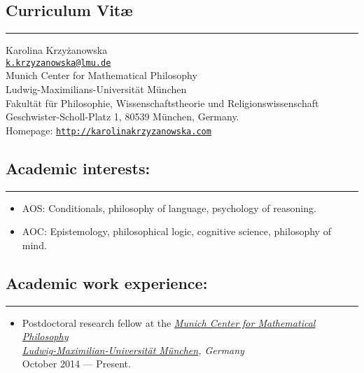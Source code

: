 \documentclass[a4paper,12pt]{article}
\begin{document}
\newcommand{\headone}[1] {
 \section*{#1}
\rule[2.5ex]{\textwidth}{2pt}}

\newcommand{\headtwo}[1]{
  \subsection*{#1}
  \rule[1.5ex]{\textwidth}{.5pt}}

\newcommand{\headthree}[1]{ {\large #1}}

\newcommand{\link}[1]{ \texttt{\href{#1}{#1}}}

\begin{small}

  \headone{Curriculum Vit\ae}
  
  Karolina Krzyżanowska\\
  \href{mailto:k.krzyzanowska@lmu.de}{\texttt{k.krzyzanowska@lmu.de}}\\
  Munich Center for Mathematical Philosophy\\
  Ludwig-Maximilians-Universität München\\
Fakultät für Philosophie, Wissenschaftstheorie und Religionswissenschaft\\
Geschwister-Scholl-Platz 1, 80539 München, Germany.\\
  Homepage: \href{http://karolinakrzyzanowska.com}{\texttt{http://karolinakrzyzanowska.com}}\\


  
  \headtwo{Academic interests:}
  \begin{itemize}
  \item AOS: Conditionals, philosophy of language, psychology of reasoning.
  \item AOC: Epistemology, philosophical logic, cognitive science,
    philosophy of mind.
  \end{itemize}
  
  \headtwo{Academic work experience:}
  \begin{itemize}
\item Postdoctoral research fellow at the \emph{\href{http://www.mcmp.philosophie.uni-muenchen.de/}{Munich Center for Mathematical Philosophy}}\\
\emph{\href{http://www.en.uni-muenchen.de/}{Ludwig-Maximilian-Universität München}, Germany}\\
October 2014 --- Present.


\end{itemize}
\end{small}
\end{document}

